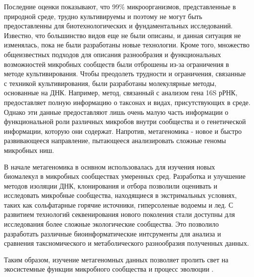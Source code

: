 Последние оценки показывают, что 99\% микроорганизмов, представленные в природной среде, трудно культивируемы и поэтому не могут быть предоставленны для биотехнологических и фундаментальных исследований. Известно, что большинство видов еще не были описаны, и данная ситуация не изменялась, пока не были разработаны новые технологии. Кроме того, множество общеизвестных подходов для описания разнообразия и функциональных возможностей микробных сообществ были отброшены из-за ограничения в методе культивирования. Чтобы преодолеть трудности и ограничения, связанные с техникой культивирования, были разработаны молекулярные методы, основанные на ДНК. Например, метод, связанный с анализом гена 16S рРНК, предоставляет полную информацию о таксонах и видах, присутствующих в среде. Однако эти данные предоставляют лишь очень малую часть информации о функциональной роли различных микробов внутри сообщества и о генетической информации, которую они содержат. Напротив, метагеномика - новое и быстро развивающееся направление, пытающееся анализировать сложные геномы микробных ниш\cite{Streit2004}.

В начале метагеномика в оснвном использовалась для изучения новых биомалекул в микробных сообществах умеренных сред. Разработка и улучшение методов изоляции ДНК, клонирования и отбора позволили оценивать и исследовать микробные сообщества, находящиеся в экстримальных условиях, таких как сольфатарные горячие источники, гиперсоленые водоемы и лед. С развитием технологий секвенирования нового поколения стали доступны для исследования более сложные экологические сообщества. Это позволило разработать различные биоинформатические интсрументы для анализа и сравнения таксномического и метаболического разнообразия полученных данных. 

Таким образом, изучение метагеномных данных позволяет пролить свет на экосистемные функции микробного сообщества и процесс эволюции \cite{Simon2011}. 

